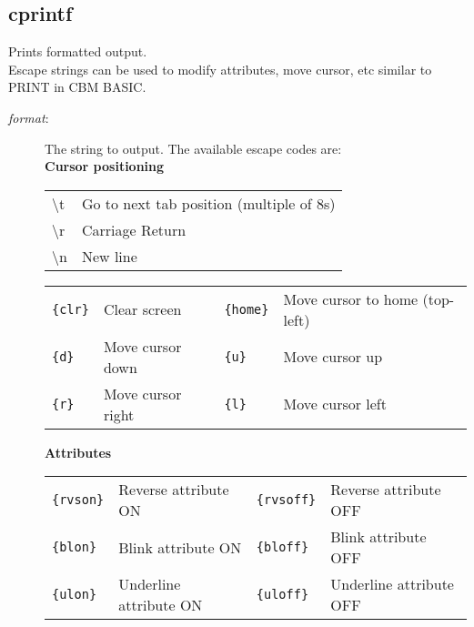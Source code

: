\subsection{cprintf}
\begin{description}[leftmargin=2cm,style=nextline]
\item [Description:] {Prints formatted output. \\
    Escape strings can be used to modify attributes, move cursor, etc similar to PRINT in CBM BASIC. 
    }
\item [Syntax:] 
\item [Parameters:]
\begin{description}\item[]
\item [{\em format}:] {The string to output. The available escape codes are: \\
    
    \textbf{Cursor positioning} \\
    \begin{tabular}{ll}
    \textbackslash t             & Go to next tab position (multiple of 8s)            \\ 
    \textbackslash r             & Carriage Return            \\
    \textbackslash n             & New line          \\
    \end{tabular}
    
    \begin{tabular}{llll}
    \texttt{\{clr\}}   &     Clear screen      &  \texttt{\{home\}}  & Move cursor to home (top-left) \\
    \texttt{\{d\}}     &    Move cursor down   & \texttt{\{u\}}      & Move cursor up \\
    \texttt{\{r\}}     &    Move cursor right  & \texttt{\{l\}}     & Move cursor left \\
    
    \end{tabular}
    
    \textbf{Attributes} \\
    \begin{tabular}{llll}
    \texttt{\{rvson\}}  &  Reverse attribute ON   & \texttt{\{rvsoff\}} &  Reverse attribute OFF \\
    \texttt{\{blon\}}   &  Blink attribute ON     & \texttt{\{bloff\}}  &  Blink attribute OFF    \\ 
    \texttt{\{ulon\}}   &  Underline attribute ON & \texttt{\{uloff\}}  &  Underline attribute OFF \\
    \end{tabular}

}
\end{description}
\end{description}
